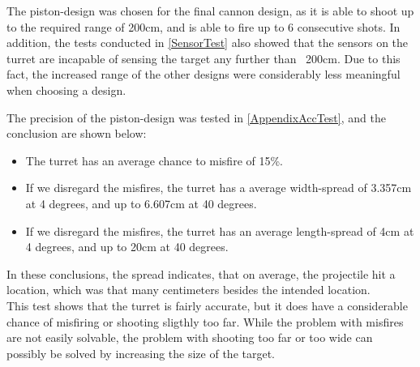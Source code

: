 The piston-design was chosen for the final cannon design, as it is able to
shoot up to the required range of 200cm, and is able to fire up to 6
consecutive shots. In addition, the tests conducted in \autoref{SensorTest} also
showed that the sensors on the turret are incapable of sensing the target any
further than ~200cm. Due to this fact, the increased range of the other
designs were considerably less meaningful when choosing a
design.\nl

The precision of the piston-design was tested in \autoref{AppendixAccTest}, and
the conclusion are shown below:

\begin{itemize}
  \item The turret has an average chance to misfire of 15\%.
  \item If we disregard the misfires, the turret has a average width-spread of
  3.357cm at 4 degrees, and up to 6.607cm at 40 degrees.
  \item If we disregard the misfires, the turret has an average length-spread of
  4cm at 4 degrees, and up to 20cm at 40 degrees.
\end{itemize}

In these conclusions, the spread indicates, that on average, the projectile hit
a location, which was that many centimeters besides the intended location.\\
This test shows that the turret is fairly accurate, but it does have a
considerable chance of misfiring or shooting sligthly too far. While the problem
with misfires are not easily solvable, the problem with shooting too far or too
wide can possibly be solved by increasing the size of the target.




